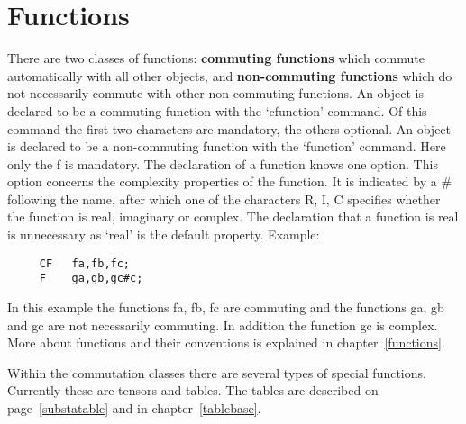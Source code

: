 \section{Functions}

\label{sect-functions}
There are two classes of functions: {\bf commuting 
functions} which commute automatically with all other objects, and {\bf 
non-commuting functions} which do not necessarily commute with other 
non-commuting functions. An object is declared to be a 
commuting function with the 
`cfunction' command. Of this command the first two characters are 
mandatory, the others optional. An object is declared to be a 
non-commuting function 
with the `function' command. Here only the f is mandatory. The declaration 
of a function knows one option. This option concerns the complexity 
properties of the function. It is indicated by a \# following the name, 
after which one of the characters R, I, C specifies whether the function is 
real, imaginary or complex. The 
declaration that a function is real is unnecessary as `real' is the default 
property. Example:
\begin{verbatim}
     CF   fa,fb,fc;
     F    ga,gb,gc#c;
\end{verbatim}
In this example the functions fa, fb, fc are commuting and the 
functions ga, gb and gc are not necessarily commuting. In addition the 
function gc is complex. More about functions and their conventions 
is explained in chapter~\ref{functions}.

Within the commutation classes there are several types of special 
functions. Currently these are tensors and 
tables. The tables are described on page~\ref{substatable} 
and in chapter~\ref{tablebase}.


